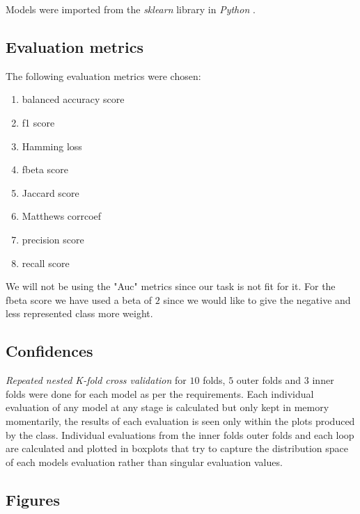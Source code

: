 \documentclass[12pt, a4paper]{article}
\begin{document}
\begin{multicols}{2}
    Models were imported from the \textit{sklearn} \cite{noauthor_scikit-learn_nodate} library in \textit{Python} \cite{noauthor_3132_nodate}.
    \newline

    \subsection{Evaluation metrics} \label{subsec:metrics}

    The following evaluation metrics were chosen:
    \newline

    \begin{enumerate} \label{enm:metrics}
        \item balanced accuracy score 
        \item f1 score
        \item Hamming loss
        \item fbeta score
        \item Jaccard score
        \item Matthews corrcoef
        \item precision score
        \item recall score
    \end{enumerate}

    We will not be using the "Auc" metrics since our task is not fit for it. For the fbeta score we have used a beta of $2$ since we would like to give the negative and less represented class more weight.
    \newline

    \subsection{Confidences} \label{subsec:conf}

    \textit{Repeated nested K-fold cross validation} for $10$ folds, $5$ outer folds and $3$ inner folds were done for each model as per the requirements. Each individual evaluation of any model at any stage is calculated but only kept in memory momentarily, the results of each evaluation is seen only within the plots produced by the class. Individual evaluations from the inner folds outer folds and each loop are calculated and plotted in boxplots that try to capture the distribution space of each models evaluation rather than singular evaluation values.
    \newline

    \subsection{Figures} \label{subsec:figs}


\end{multicols}
\end{document}

